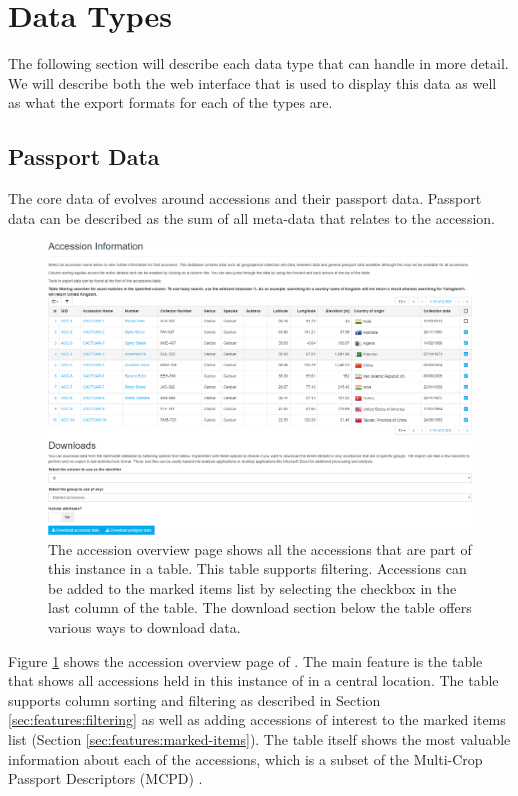 \section{Data Types}
The following section will describe each data type that {\germinate} can handle in more detail. We will describe both the web interface that is used to display this data as well as what the export formats for each of the types are.

\subsection{Passport Data}
The core data of {\germinate} evolves around accessions and their passport data. Passport data can be described as the sum of all meta-data that relates to the accession.

\begin{figure}
	\centering
	\includegraphics[width=0.85\linewidth]{img/data/accessions.png}
	\caption{The accession overview page shows all the accessions that are part of this {\germinate} instance in a table. This table supports filtering. Accessions can be added to the marked items list by selecting the checkbox in the last column of the table. The download section below the table offers various ways to download data.}
	\label{fig:data:accessions}
\end{figure}

Figure \ref{fig:data:accessions} shows the accession overview page of {\germinate}. The main feature is the table that shows all accessions held in this instance of {\germinate} in a central location. The table supports column sorting and filtering as described in Section \ref{sec:features:filtering} as well as adding accessions of interest to the marked items list (\cf Section \ref{sec:features:marked-items}). The table itself shows the most valuable information about each of the accessions, which is a subset of the Multi-Crop Passport Descriptors (MCPD) \cite{mcpd}.

